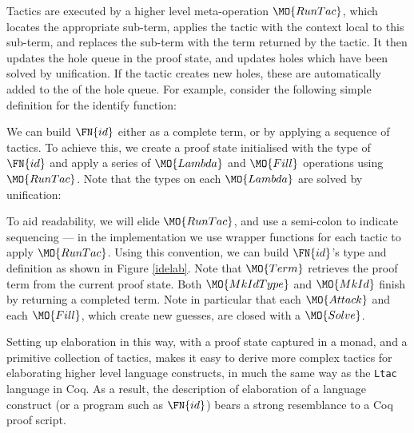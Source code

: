 Tactics are executed by a higher level meta-operation $\MO{RunTac}$, which
locates the appropriate sub-term, applies the tactic with the context
local to this sub-term, and
replaces the sub-term with the term returned by the
tactic. It then updates the hole queue in the proof state, and updates holes which have
been solved by unification. If the tactic creates new holes, these are automatically
added to the  of the hole queue.
For example, consider the following simple
\TT{} definition for the identify function:


We can build $\FN{id}$ either as a complete term, or by applying a sequence of tactics.
To achieve this, we create a proof state initialised with the type of $\FN{id}$ and
apply a series of $\MO{Lambda}$ and $\MO{Fill}$ operations using $\MO{RunTac}$.
Note that the types on each $\MO{Lambda}$ are solved by unification:


To aid readability, we will elide $\MO{RunTac}$, and use a semi-colon to indicate
sequencing --- in the implementation we use wrapper functions for each tactic to
apply $\MO{RunTac}$.
Using this convention, we can build $\FN{id}$'s type and definition as shown
in Figure \ref{idelab}. Note that $\MO{Term}$ retrieves the proof term from the current proof
state. Both $\MO{MkIdType}$ and $\MO{MkId}$ finish by returning a completed \TT{} term.
Note in particular that each $\MO{Attack}$ and each $\MO{Fill}$, which create new guesses,
are closed with a $\MO{Solve}$.

Setting up elaboration in this way, with a proof state captured in a monad,
and a primitive collection of tactics,
makes it easy to derive more complex tactics for elaborating higher level language constructs,
in much the same way as the \texttt{Ltac} language in Coq. As a result, the
description of elaboration of
a language construct (or a program such as $\FN{id}$) bears a strong resemblance to
a Coq proof script.

